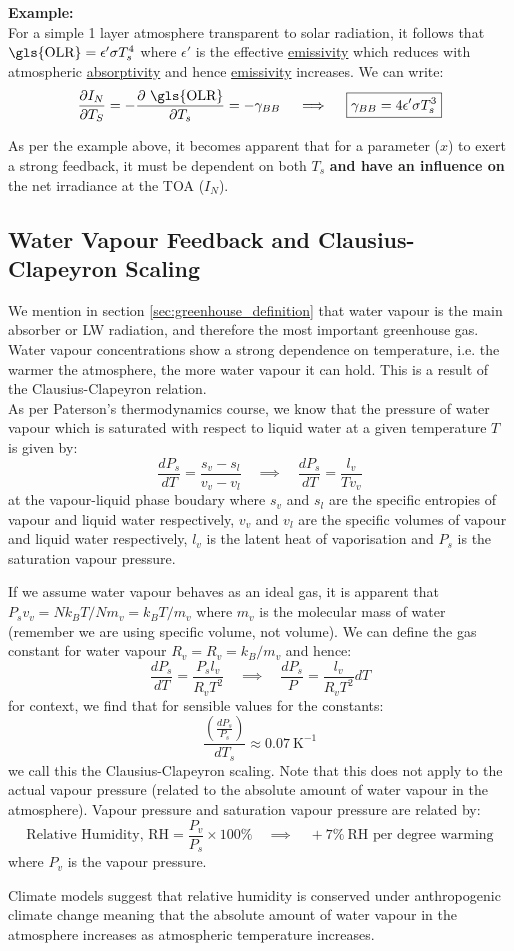 \begin{tcolorbox}
    \textbf{Example:\\}
    For a simple 1 layer atmosphere transparent to solar radiation, it follows that $\text{\gls{OLR}} = \epsilon ' \sigma T_s^4$
    where $\epsilon '$ is the effective \hyperlink{glo:emissivity}{emissivity} which reduces with atmospheric 
    \hyperlink{glo:absorptivity}{absorptivity} and hence \hyperlink{glo:emissivity}{emissivity} increases. We can write:
    $$
    \frac{\partial I_N}{\partial T_S} = -\frac{\partial\ \text{\gls{OLR}}}{\partial T_s} = -\gamma_{BB} \quad \implies \quad
    \boxed{\gamma_{BB} = 4 \epsilon ' \sigma T_s^3}
    $$
\end{tcolorbox}

As per the example above, it becomes apparent that for a parameter ($x$) to exert a strong feedback, it must be dependent
on both $T_s$ \textbf{and have an influence on} the net irradiance at the \gls{TOA} ($I_N$). 

\subsection{Water Vapour Feedback and Clausius-Clapeyron Scaling}
\label{sec:clausius-clapeyron}

We mention in section \ref{sec:greenhouse_definition} that water vapour is the main absorber or \gls{LW} radiation, and 
therefore the most important greenhouse gas. Water vapour concentrations show a strong dependence on temperature, i.e.
the warmer the atmosphere, the more water vapour it can hold. This is a result of the Clausius-Clapeyron relation.\\

As per Paterson's thermodynamics course, we know that the pressure of water vapour which is saturated with respect to 
liquid water at a given temperature $T$ is given by:
$$
\frac{dP_s}{dT} = \frac{s_v - s_l}{v_v - v_l} \quad \implies \quad \boxed{\frac{dP_s}{dT} = \frac{l_v}{T v_v}}
$$
at the vapour-liquid phase boudary where $s_v$ and $s_l$ are the specific entropies of vapour and liquid water respectively,
$v_v$ and $v_l$ are the specific volumes of vapour and liquid water respectively, $l_v$ is the latent heat of
vaporisation and $P_s$ is the saturation vapour pressure.

If we assume water vapour behaves as an ideal gas, it is apparent that $P_s v_v = Nk_B T/Nm_v = k_B T / m_v$ where $m_v$ is
the molecular mass of water (remember we are using specific volume, not volume). We can define the gas constant for water
vapour $R_v = R_v = k_B / m_v$ and hence:
$$
\frac{dP_s}{dT} = \frac{P_s l_v}{R_v T^2} \quad \implies \quad \frac{dP_s}{P} = \frac{l_v}{R_v T^2}dT
$$
for context, we find that for sensible values for the constants:
$$
\frac{\left(\frac{dP_s}{P_s}\right)}{dT_s} \approx 0.07\ \text{K}^{-1}
$$
we call this the Clausius-Clapeyron scaling. Note that this does not apply to the actual vapour pressure (related to
the absolute amount of water vapour in the atmosphere). Vapour pressure and saturation vapour pressure are related by:
$$
\text{Relative Humidity, RH} = \frac{P_v}{P_s} \times 100\% \quad \implies \quad +7\%\ \text{RH per degree warming}
$$
where $P_v$ is the vapour pressure. 

Climate models suggest that relative humidity is conserved under anthropogenic climate change meaning that the absolute 
amount of water vapour in the atmosphere increases as atmospheric temperature increases.
